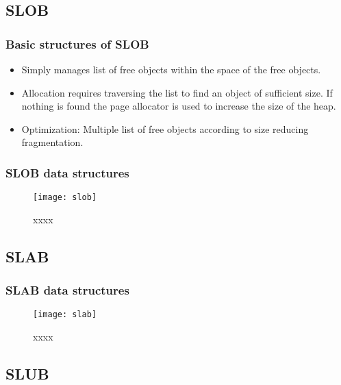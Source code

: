 \subsection{SLOB} %
\begin{frame}[plain,t]    
    \frametitle{Basic structures of SLOB}
    \begin{itemize}
        \item Simply manages list of free objects within the space of the free objects.
        \item Allocation requires traversing the list to find an object of sufficient size. If nothing is found the page allocator is used to increase the size of the heap.
        \item Optimization: Multiple list of free objects according to size reducing fragmentation.
    \end{itemize}
\end{frame}
\begin{frame}[plain,t]    
    \frametitle{SLOB data structures}
    \begin{figure}
        \centering
        \texttt{[image: slob]}
        \caption{xxxx}
    \end{figure}

\end{frame}
\subsection{SLAB} %
\begin{frame}[plain,t]    
    \frametitle{SLAB data structures}
    \begin{figure}
        \centering
        \texttt{[image: slab]}
        \caption{xxxx}
    \end{figure}
\end{frame}
\subsection{SLUB} %


